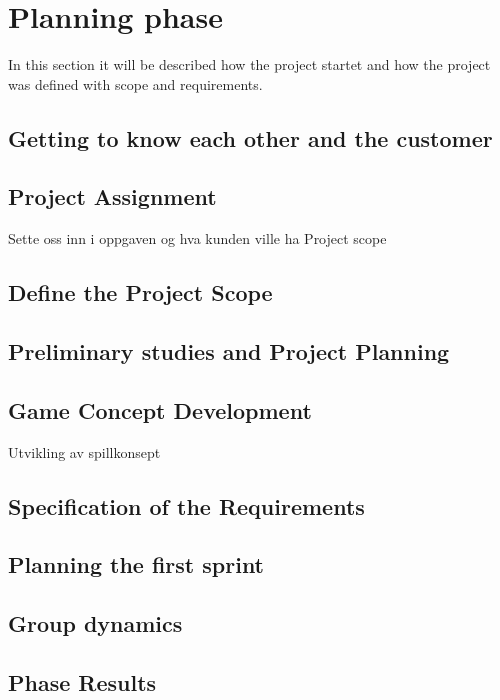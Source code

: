 \section{Planning phase}
	In this section it will be described how the project startet
	and how the project was defined with scope and requirements.

\subsection{Getting to know each other and the customer}
	

\subsection{Project Assignment}
	Sette oss inn i oppgaven og hva kunden ville ha
	Project scope

\subsection{Define the Project Scope}

\subsection{Preliminary studies and Project Planning}

\subsection{Game Concept Development}
	Utvikling av spillkonsept

\subsection{Specification of the Requirements}

\subsection{Planning the first sprint}

\subsection{Group dynamics}

\subsection{Phase Results}
